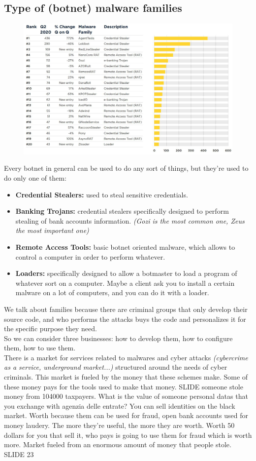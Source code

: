     \subsection{Type of (botnet) malware families}
        \begin{figure}[ht!]
            \centering
            \includegraphics[width=0.6\linewidth]{families.png}
        \end{figure}
        Every botnet in general can be used to do any sort of things, but they're used to do only one of them:
        \begin{itemize}
            \item \textbf{Credential Stealers:} used to steal sensitive credentials.
            \item \textbf{Banking Trojans:} credential stealers specifically designed to perform stealing of bank accounts information. \textit{(Gozi is the most common one, Zeus the most important one)}
            \item \textbf{Remote Access Tools:} basic botnet oriented malware, which allows to control a computer in order to perform whatever.
            \item \textbf{Loaders:} specifically designed to allow a botmaster to load a program of whatever sort on a computer. Maybe a client ask you to install a certain malware on a lot of computers, and you can do it with a loader.
        \end{itemize}
        We talk about families because there are criminal groups that only develop their source code, and who performs the attacks buys the code and personalizes it for the specific purpose they need.\\
        So we can consider three businesses: how to develop them, how to configure them, how to use them.\\
        There is a market for services related to malwares and cyber attacks \textit{(cybercrime as a service, underground market...)} structured around the needs of cyber criminals. This market is fueled by the money that these schemes make. Some of these money pays for the tools used to make that money.
\iffalse
SLIDE 
    someone stole money from 104000 taxpayers.
    What is the value of someone personal datas that you exchange with agenzia delle entrate?
    You can sell identities on the black market. Worth because them can be used for fraud, open bank accounts used for money laudery.
    The more they're useful, the more they are worth.
    Worth 50 dollars for you that sell it, who pays is going to use them for fraud which is worth more.
    Market fueled from an enormous amount of money that people stole.
SLIDE 23


